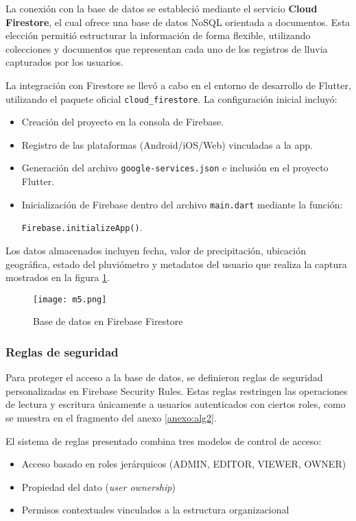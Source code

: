 La conexión con la base de datos se estableció mediante el servicio \textbf{Cloud Firestore}, el cual ofrece una base de datos NoSQL orientada a documentos. Esta elección permitió estructurar la información de forma flexible, utilizando colecciones y documentos que representan cada uno de los registros de lluvia capturados por los usuarios.

La integración con Firestore se llevó a cabo en el entorno de desarrollo de Flutter, utilizando el paquete oficial \texttt{cloud\_firestore}. La configuración inicial incluyó:

\begin{itemize}
    \item Creación del proyecto en la consola de Firebase.
    \item Registro de las plataformas (Android/iOS/Web) vinculadas a la app.
    \item Generación del archivo \texttt{google-services.json} e inclusión en el proyecto Flutter.
    \item Inicialización de Firebase dentro del archivo \texttt{main.dart} mediante la función:
    
    \texttt{Firebase.initializeApp()}.
\end{itemize}

Los datos almacenados incluyen fecha, valor de precipitación, ubicación geográfica, estado del pluviómetro y metadatos del usuario que realiza la captura mostrados en la figura \ref{m5}.

\begin{figure}[h!]
\centering
  \texttt{[image: m5.png]}
  \caption{Base de datos en Firebase Firestore}
  \label{m5}
\end{figure}

\newpage
\subsubsection*{Reglas de seguridad}

Para proteger el acceso a la base de datos, se definieron reglas de seguridad personalizadas en Firebase Security Rules. Estas reglas restringen las operaciones de lectura y escritura únicamente a usuarios autenticados con ciertos roles, como se muestra en el fragmento del anexo \ref{anexo:alg2}.


El sistema de reglas presentado combina tres modelos de control de acceso:

\begin{itemize}
\item Acceso basado en roles jerárquicos (ADMIN, EDITOR, VIEWER, OWNER)
\item Propiedad del dato (\textit{user ownership})
\item Permisos contextuales vinculados a la estructura organizacional
\end{itemize}



